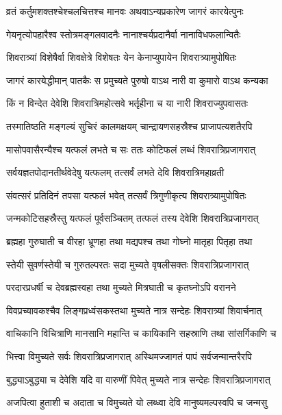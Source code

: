 \twolineshloka
{व्रतं कर्तुमशक्तश्चेश्चलचित्तश्च मानवः}
{अथवाऽन्यप्रकारेण जागरं कारयेत्पुनः} %

\twolineshloka
{गेयनृत्योपहारैश्व स्तोत्रमङ्गलवादनैः}
{नानाश्चर्यप्रदानैर्वा नानाविधफलान्वितैः} %

\twolineshloka
{शिवरात्र्यां विशेषैर्वा शिवक्षेत्रे विशेषतः}
{येन केनाप्युपायेन शिवरात्र्यामुपोषितः} %

\twolineshloka
{जागरं कारयेद्धीमान् पातकैः स प्रमुच्यते}
{पुरुषो वाऽथ नारी वा कुमारो वाऽथ कन्यका} %

\twolineshloka
{किं न विन्देत देवेशि शिवरात्रिमहोत्सवे}
{भर्तृहीना च या नारी शिवराज्युपवासतः} %

\twolineshloka
{तस्मातिष्ठति मङ्गल्यं सुचिरं कालमक्षयम्}
{चान्द्रायणसहस्रैश्च प्राजापत्यशतैरपि} %

\twolineshloka
{मासोपवासैरन्यैश्च यत्फलं लभते च सः}
{ततः कोटिफलं\footnotemark{} लब्धं शिवरात्रिप्रजागरात्} %


\twolineshloka
{सर्वयज्ञतपोदानतीर्थवेदेषु यत्फलम्}
{तत्सर्वं लभते देवि शिवरात्रिमहाव्रती} %

\twolineshloka
{संवत्सरं प्रतिदिनं तपसा यत्फलं भवेत्}
{तत्सर्वं त्रिगुणीकृत्य शिवरात्र्यामुपोषितः} %

\twolineshloka
{जन्मकोटिसहस्रैस्तु यत्फलं पूर्वसञ्चितम्}
{तत्फलं तस्य देवेशि शिवरात्रिप्रजागरात्} %

\twolineshloka
{ब्रह्महा गुरुघाती च वीरहा भ्रूणहा तथा}
{मद्यपश्च तथा गोघ्नो मातृहा पितृहा तथा} %

\twolineshloka
{स्तेयी सुवर्णस्तेयी च गुरुतल्परतः सदा}
{मुच्यते वृषलीसक्तः शिवरात्रिप्रजागरात्} %

\twolineshloka
{परदारप्रधर्षी च देवब्रह्मस्वहा तथा}
{मुच्यते मित्रघाती च कृतघ्नोऽपि वरानने} %

\twolineshloka
{विव\footnotemark{}प्रच्यावकश्चैव लिङ्गप्रध्वंसकस्तथा}
{मुच्यते नात्र सन्देहः शिवरात्र्यां शिवार्चनात्} %


\twolineshloka
{वाचिकानि विचित्राणि मानसानि महान्ति च}
{कायिकानि सहस्राणि तथा सांसर्गिकाणि च} %

\twolineshloka
{भित्त्वा विमुच्यते सर्वः शिवरात्रिप्रजागरात्}
{अस्थिमज्जागतं पापं सर्वजन्मान्तरैरपि} %

\twolineshloka
{बुद्ध्याऽबुद्ध्या च देवेशि यदि वा वारुणीं पिवेत्}
{मुच्यते नात्र सन्देहः शिवरात्रिप्रजागरात्} %

\twolineshloka
{अजपित्वा हुताशी च अदाता च विमुच्यते}
{यो लब्ध्वा देवि मानुष्यमल्पस्वपि च जन्मसु} %

